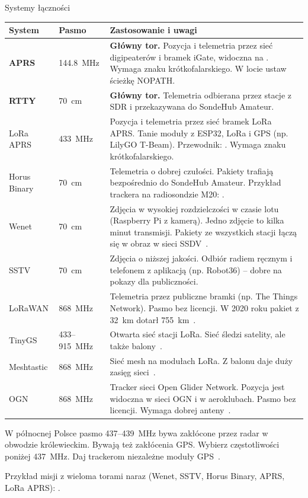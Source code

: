\begin{sekcja}{Systemy łączności}
\renewcommand{\arraystretch}{1.3}
\small
\begin{tabularx}{\linewidth}{@{}P{22mm}P{18mm}L@{}}
\toprule
\textbf{System} & \textbf{Pasmo} & \textbf{Zastosowanie i uwagi}\\\midrule
\textbf{APRS} & \SI{144.8}{MHz} & \textbf{Główny tor.} Pozycja i telemetria przez sieć digipeaterów i bramek iGate, widoczna na . Wymaga znaku krótkofalarskiego. W locie ustaw ścieżkę NOPATH.\\
\textbf{RTTY} & \SI{70}{cm} & \textbf{Główny tor.} Telemetria odbierana przez stacje z SDR i przekazywana do SondeHub Amateur.\\\midrule
LoRa APRS & \SI{433}{MHz} & Pozycja i telemetria przez sieć bramek LoRa APRS. Tanie moduły z ESP32, LoRa i GPS (np. LilyGO T-Beam). Przewodnik: \cite{loraaprs}. Wymaga znaku krótkofalarskiego.\\
Horus Binary & \SI{70}{cm} & Telemetria o dobrej czułości. Pakiety trafiają bezpośrednio do SondeHub Amateur. Przykład trackera na radiosondzie M20: \cite{m20fw}.\\
Wenet & \SI{70}{cm} & Zdjęcia w wysokiej rozdzielczości w czasie lotu (Raspberry Pi z kamerą). Jedno zdjęcie to kilka minut transmisji. Pakiety ze wszystkich stacji łączą się w obraz w sieci SSDV~\cite{wenet}.\\
SSTV & \SI{70}{cm} & Zdjęcia o niższej jakości. Odbiór radiem ręcznym i telefonem z aplikacją (np. Robot36) -- dobre na pokazy dla publiczności.\\
LoRaWAN & \SI{868}{MHz} & Telemetria przez publiczne bramki (np. The Things Network). Pasmo bez licencji. W 2020 roku pakiet z \SI{32}{km} dotarł \SI{755}{km}~\cite{raport2020}.\\
TinyGS & 433--\SI{915}{MHz} & Otwarta sieć stacji LoRa. Sieć śledzi satelity, ale także balony~\cite{tinygs}.\\
Meshtastic & \SI{868}{MHz} & Sieć mesh na modułach LoRa. Z balonu daje duży zasięg sieci~\cite{meshtastic}.\\
OGN & \SI{868}{MHz} & Tracker sieci Open Glider Network. Pozycja jest widoczna w sieci OGN i w aeroklubach. Pasmo bez licencji. Wymaga dobrej anteny~\cite{ogn}.\\
\bottomrule
\end{tabularx}
\normalsize

\begin{uwaga}[Zakłócenia]W północnej Polsce pasmo 437--\SI{439}{MHz} bywa zakłócone przez radar w obwodzie królewieckim. Bywają też zakłócenia GPS. Wybierz częstotliwości poniżej \SI{437}{MHz}. Daj trackerom niezależne moduły GPS~\cite{sp2gryf}.\end{uwaga}

Przykład misji z wieloma torami naraz (Wenet, SSTV, Horus Binary, APRS, LoRa APRS): \cite{sp2gryf}.
\end{sekcja}

